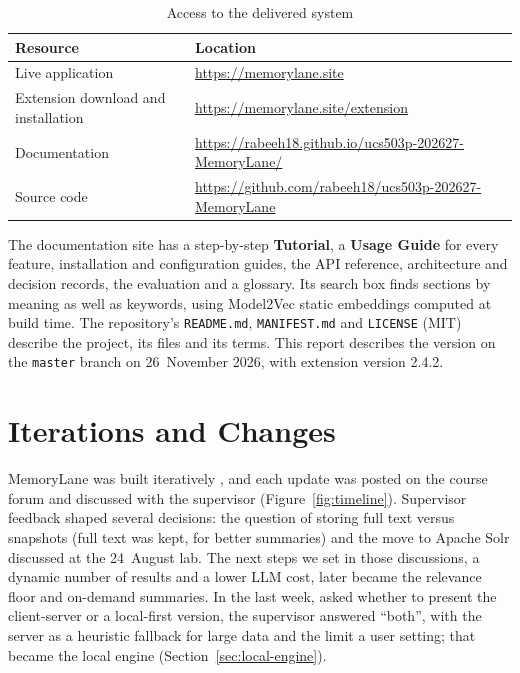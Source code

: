 \begin{table}[H]
\centering
\footnotesize
\begin{tabularx}{\textwidth}{p{} L}
\toprule
\textbf{Resource} & \textbf{Location} \\
\midrule
Live application & \url{https://memorylane.site} \\
Extension download and installation & \url{https://memorylane.site/extension} \\
Documentation & \url{https://rabeeh18.github.io/ucs503p-202627-MemoryLane/} \\
Source code & \url{https://github.com/rabeeh18/ucs503p-202627-MemoryLane} \\
\bottomrule
\end{tabularx}
\caption{Access to the delivered system}
\label{tab:resources}
\end{table}

The documentation site \cite{mkdocsmaterial} has a step-by-step
\textbf{Tutorial}, a \textbf{Usage Guide} for every feature, installation and
configuration guides, the API reference, architecture and decision records,
the evaluation and a glossary. Its search box finds sections by meaning as
well as keywords, using Model2Vec \cite{model2vec} static embeddings computed
at build time. The repository's \texttt{README.md}, \texttt{MANIFEST.md} and
\texttt{LICENSE} (MIT) describe the project, its files and its terms. This
report describes the version on the \texttt{master} branch on 26~November
2026, with extension version 2.4.2.

\section{Iterations and Changes}
\label{sec:iterations}

MemoryLane was built iteratively \cite{sommerville2016se}, and each update
was posted on the course forum and discussed with the supervisor
(Figure~\ref{fig:timeline}). Supervisor feedback shaped several decisions: the
question of storing full text versus snapshots (full text was kept, for better
summaries) and the move to Apache Solr discussed at the 24~August lab. The
next steps we set in those discussions, a dynamic number of results and a
lower LLM cost, later became the relevance floor and on-demand summaries. In
the last week, asked whether to present the client-server or a local-first
version, the supervisor answered ``both'', with the server as a heuristic
fallback for large data and the limit a user setting; that became the local
engine (Section~\ref{sec:local-engine}).


